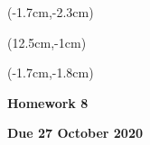 \documentclass[12pt, oneside]{article}
\begin{document}
\begin{textblock*}{4cm}(-1.7cm,-2.3cm)
\end{textblock*}

\begin{textblock*}{8cm}(12.5cm,-1cm)
\end{textblock*}
\begin{textblock*}{13.5cm}(-1.7cm,-1.8cm)
\end{textblock*}

\vspace{1cm}

\begin{center}
\textbf{\Large Homework 8}

\textbf{Due 27 October 2020}
\end{center}
\end{document}
